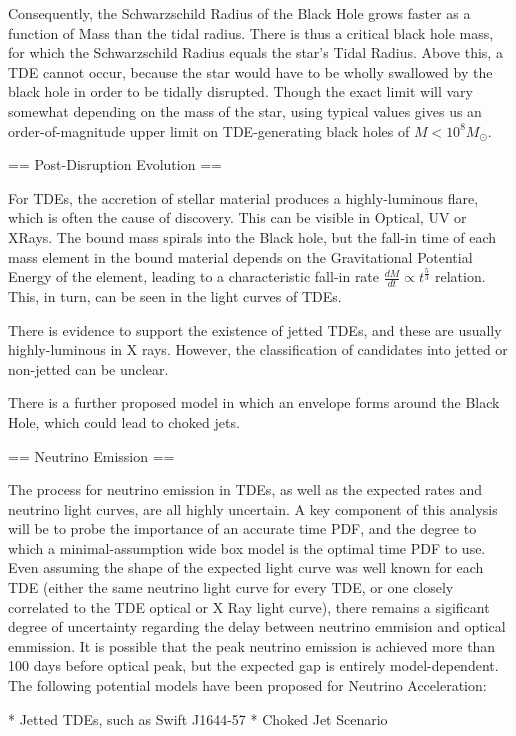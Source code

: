 \documentclass[]{article}
\begin{document}
Consequently, the Schwarzschild Radius of the Black Hole grows faster as a function of Mass than the tidal radius. There is thus a critical black hole mass, for which the Schwarzschild Radius equals the star's Tidal Radius. Above this, a TDE cannot occur, because the star would have to be wholly swallowed by the black hole in order to be tidally disrupted. Though the exact limit will vary somewhat depending on the mass of the star, using typical values gives us an order-of-magnitude upper limit on TDE-generating black holes of $M < 10^{8} M_{\odot}$.

== Post-Disruption Evolution ==

For TDEs, the accretion of stellar material produces a highly-luminous flare, which is often the cause of discovery. This can be visible in Optical, UV or XRays. The bound mass spirals into the Black hole, but the fall-in time of each mass element in the bound material depends on the Gravitational Potential Energy of the element, leading to a characteristic fall-in rate $ \frac{dM}{dt} \propto t^{\frac{5}{3}}$ relation. This, in turn, can be seen in the light curves of TDEs.

There is evidence to support the existence of jetted TDEs, and these are usually highly-luminous in X rays. However, the classification of candidates into jetted or non-jetted can be unclear.

There is a further proposed model in which an envelope forms around the Black Hole, which could lead to choked jets.

== Neutrino Emission ==

The process for neutrino emission in TDEs, as well as the expected rates and neutrino light curves, are all highly uncertain. A key component of this analysis will be to probe the importance of an accurate time PDF, and the degree to which a minimal-assumption wide box model is the optimal time PDF to use. Even assuming the shape of the expected light curve was well known for each TDE (either the same neutrino light curve for every TDE,  or one closely correlated to the TDE optical or X Ray light curve), there remains a sigificant degree of uncertainty regarding the delay between neutrino emmision and optical emmission. It is possible that the peak neutrino emission is achieved more than 100 days before optical peak, but the expected gap is entirely model-dependent. The following potential models have been proposed for Neutrino Acceleration:

* Jetted TDEs, such as Swift J1644-57
* Choked Jet Scenario
\end{document}
